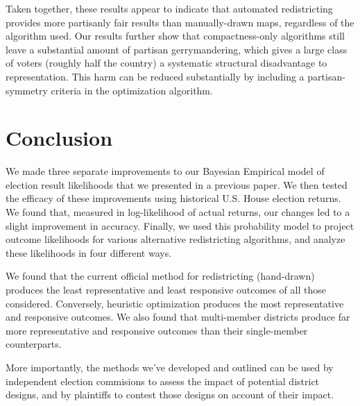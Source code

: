 \documentclass[preprint,12pt]{article}
\begin{document}
Taken together, these results appear to indicate that automated redistricting provides more partisanly fair results than manually-drawn maps, regardless of the algorithm used.  Our results further show that compactness-only algorithms still leave a substantial amount of partisan gerrymandering, which gives a large class of voters (roughly half the country) a systematic structural disadvantage to representation.  This harm can be reduced substantially by including a partisan-symmetry criteria in the optimization algorithm.

\section{Conclusion}

We made three separate improvements to our Bayesian Empirical model of election result likelihoods that we presented in a previous paper.  We then tested the efficacy of these improvements using historical U.S. House election returns.  We found that, measured in log-likelihood of actual returns, our changes led to a slight improvement in accuracy.  Finally, we used this probability model to project outcome likelihoods for various alternative redistricting algorithms, and analyze these likelihoods in four different ways.

We found that the current official method for redistricting (hand-drawn) produces the least representative and least responsive outcomes of all those considered.  Conversely, heuristic optimization produces the most representative and responsive outcomes.  We also found that multi-member districts produce far more representative and responsive outcomes than their single-member counterparts.

More importantly, the methods we've developed and outlined can be used by independent election commisions to assess the impact of potential district designs, and by plaintiffs to contest those designs on account of their impact.



\clearpage
\end{document}
